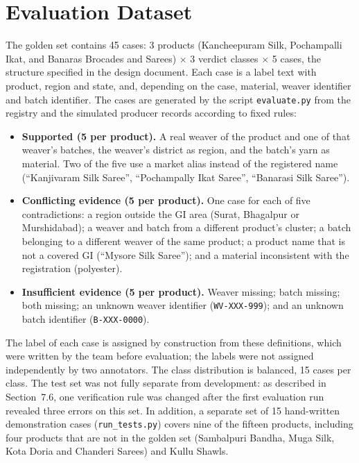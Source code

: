 \section{Evaluation Dataset}

The golden set contains 45 cases: 3 products (Kancheepuram Silk, Pochampalli Ikat, and Banaras
Brocades and Sarees) $\times$ 3 verdict classes $\times$ 5 cases, the structure specified in the design
document. Each case is a label text with product, region and state, and, depending on the case,
material, weaver identifier and batch identifier. The cases are generated by the script
\texttt{evaluate.py} from the registry and the simulated producer records according to fixed rules:

\begin{itemize}[itemsep=2pt]
\item \textbf{Supported (5 per product).} A real weaver of the product and one of that weaver's
batches, the weaver's district as region, and the batch's yarn as material. Two of the five use a
market alias instead of the registered name (``Kanjivaram Silk Saree'', ``Pochampally Ikat Saree'',
``Banarasi Silk Saree'').
\item \textbf{Conflicting evidence (5 per product).} One case for each of five contradictions: a region
outside the GI area (Surat, Bhagalpur or Murshidabad); a weaver and batch from a different product's
cluster; a batch belonging to a different weaver of the same product; a product name that is not a
covered GI (``Mysore Silk Saree''); and a material inconsistent with the registration (polyester).
\item \textbf{Insufficient evidence (5 per product).} Weaver missing; batch missing; both missing; an
unknown weaver identifier (\texttt{WV-XXX-999}); and an unknown batch identifier (\texttt{B-XXX-0000}).
\end{itemize}

The label of each case is assigned by construction from these definitions, which were written by the
team before evaluation; the labels were not assigned independently by two annotators. The class
distribution is balanced, 15 cases per class. The test set was not fully separate from development:
as described in Section~7.6, one verification rule was changed after the first evaluation run revealed
three errors on this set. In addition, a separate set of 15 hand-written demonstration cases
(\texttt{run\_tests.py}) covers nine of the fifteen products, including four products that are not in
the golden set (Sambalpuri Bandha, Muga Silk, Kota Doria and Chanderi Sarees) and Kullu Shawls.

